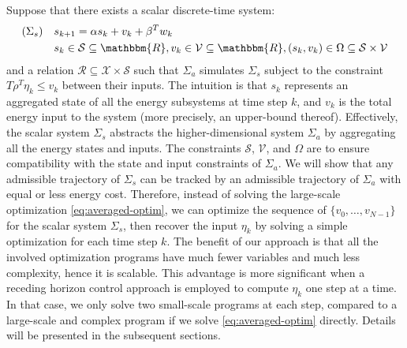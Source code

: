 Suppose that there exists a scalar discrete-time system:
\begin{align*}
(\Sigma_s) \quad
& s_{k + 1} = \alpha s_k + v_k + \beta^T w_{k} \\
& s_k \in \SSet \subseteq \mathbbm{R},
  v_k \in \VSet \subseteq \mathbbm{R},
  (s_k, v_k) \in \Omega \subseteq \SSet \times \VSet
\end{align*}
and a relation $\mathcal{R} \subseteq \mathcal{X} \times \mathcal{S}$ such
that $\Sigma_a$ simulates $\Sigma_s$ subject to the constraint $T \rho^{T} \eta_k
\leqslant v_k$ between their inputs. The intuition is that $s_k$ represents an
aggregated state of all the energy subsystems at time step $k$, and $v_k$ is
the total energy input to the system (more precisely, an upper-bound
thereof). Effectively, the scalar system $\Sigma_s$ abstracts the
higher-dimensional system $\Sigma_a$ by aggregating all the energy states and
inputs. The constraints $\mathcal{S}$, $\mathcal{V}$, and $\Omega$ are to
ensure compatibility with the state and input constraints of $\Sigma_a$. We
will show that any admissible trajectory of $\Sigma_s$ can be tracked by an
admissible trajectory of $\Sigma_a$ with equal or less energy cost. %
Therefore, instead of solving the large-scale optimization \eqref{eq:averaged-optim}, we can
optimize the sequence of $\{ v_0, \ldots, v_{N - 1} \}$ for the scalar system
$\Sigma_s$, then recover the input $\eta_k$ by solving a simple optimization for
each time step $k$.
The benefit of our approach is that all the involved optimization
programs have much fewer variables and much less complexity, hence it is scalable.
This advantage is more significant when a receding horizon control approach is employed to
compute $\eta_k$ one step at a time.
In that case, we only solve two small-scale programs at each step, compared to a large-scale and  complex program if we solve \eqref{eq:averaged-optim} directly.
Details will be presented in the subsequent sections.

